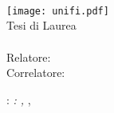 \begin{titlepage}
	\begin{center}
		\large
		\hfill
		\vfill
		\begingroup
			\spacedallcaps{\myUni}\\
			\myFaculty \\
			\myDegree \\ 
			\vspace{0.5cm}
			\texttt{[image: unifi.pdf]}\\
			\vspace{0.5cm}
			Tesi di Laurea
		\endgroup
		\vfill
		\begingroup
			\color{Maroon}\spacedallcaps{\myTitle}\\
			\spacedlowsmallcaps{\mySubtitle}\\
			\bigskip
		\endgroup
		\spacedlowsmallcaps{\myName}
		\vfill
		Relatore: \textit{\myProf}\\
		Correlatore: \textit{\mySupervisor}
		\vfill
		\myTime
		\vfill
	\end{center}
\end{titlepage}
\newpage
	\thispagestyle{empty}
	\hfill
	\vfill
	\noindent\myName: \textit{\myTitle: \mySubtitle,} \myDegree, \textcopyright\ \myTime
